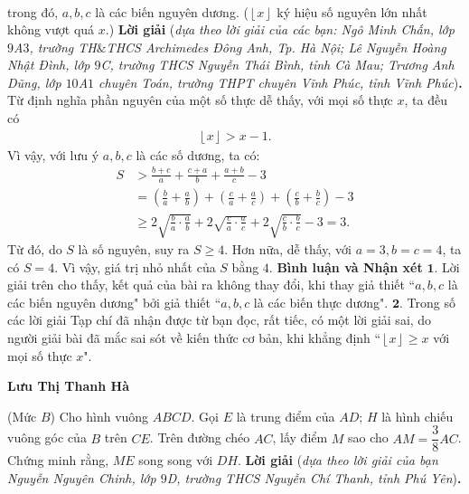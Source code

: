 \begin{multicols}{2}
\begin{align*}
	\end{align*}
	trong đó, $a, b, c$ là các biến nguyên dương.
	($\left\lfloor x \right\rfloor $  ký hiệu số nguyên lớn nhất không vượt quá $x$.)
	\vskip 0.05cm
	\textbf{\color{thachthuctoanhoc}Lời giải} (\textit{dựa theo lời giải của các bạn: Ngô Minh Chấn, lớp $9$A$3$, trường TH$\&$THCS Archimedes Đông Anh, Tp. Hà Nội; Lê Nguyễn Hoàng Nhật Đình, lớp $9$C, trường THCS Nguyễn Thái Bình, tỉnh Cà Mau; Trương Anh Dũng, lớp $10$A$1$ chuyên Toán, trường THPT chuyên Vĩnh Phúc, tỉnh Vĩnh Phúc})\textbf{\color{thachthuctoanhoc}.}
	\vskip 0.05cm
	Từ định nghĩa phần nguyên của một số thực dễ thấy, với mọi số thực $x$, ta đều có
	\begin{align*}
		\left\lfloor x \right\rfloor  > x -1.
	\end{align*}
	Vì vậy, với lưu ý $a, b, c$ là các số dương, ta có:
	\begin{align*}
			S &> \frac{{b + c}}{a} + \frac{{c + a}}{b} + \frac{{a + b}}{c} - 3 \\
			&= \left( {\frac{b}{a} + \frac{a}{b}} \right) + \left( {\frac{c}{a} + \frac{a}{c}} \right) + \left( {\frac{c}{b} + \frac{b}{c}} \right) - 3\\
			 &\ge 2\sqrt {\frac{b}{a} \!\cdot\! \frac{a}{b}}  \!+\! 2\sqrt {\frac{c}{a} \!\cdot\! \frac{a}{c}}  \!+\! 2\sqrt {\frac{c}{b} \!\cdot\! \frac{b}{c}}  \!-\! 3 \!=\! 3.
	\end{align*}
	Từ đó, do $S$ là số nguyên, suy ra $S \ge 4$.
	\vskip 0.05cm
	Hơn nữa, dễ thấy, với $a = 3, b = c = 4$, ta có $S = 4$.
	\vskip 0.05cm
	Vì vậy, giá trị nhỏ nhất của $S$ bằng $4$.
	\vskip 0.05cm
	\textbf{\color{thachthuctoanhoc}Bình luận và Nhận xét}
	\vskip 0.05cm
	$\pmb{1.}$ Lời giải trên cho thấy, kết quả của bài ra không thay đổi, khi thay giả thiết ``$a, b, c$ là các biến nguyên dương" bởi giả thiết ``$a, b, c$ là các biến thực dương".
	\vskip 0.05cm
	$\pmb{2.}$ Trong số các lời giải Tạp chí đã nhận được từ bạn đọc, rất tiếc, có một lời giải sai, do người giải bài đã mắc sai sót về kiến thức cơ bản, khi khẳng định ``$\left\lfloor x \right\rfloor  \ge x$  với mọi số thực $x$".
	\begin{flushright}
		\textbf{\color{thachthuctoanhoc}Lưu Thị Thanh Hà}
	\end{flushright}
	{}
	(Mức $B$) Cho hình vuông $ABCD$. Gọi $E$ là trung điểm của $AD$; $H$ là hình chiếu vuông góc của $B$ trên $CE$. Trên đường chéo $AC$, lấy điểm $M$ sao cho $AM = \dfrac{3}{8}AC$. Chứng minh rằng, $ME$ song song với $DH$.
	\vskip 0.05cm
	\textbf{\color{thachthuctoanhoc}Lời giải} (\textit{dựa theo lời giải của bạn Nguyễn Nguyên Chinh, lớp $9$D, trường THCS Nguyễn Chí Thanh, tỉnh Phú Yên})\textbf{\color{thachthuctoanhoc}.}

\end{multicols}

